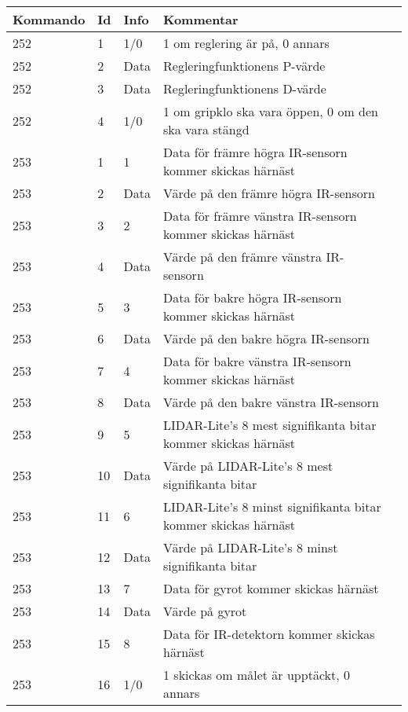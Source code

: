 \documentclass[11pt]{article}
\begin{document}
\begin{flushleft}
\begin{table}[h]
\begin{tabular}{|l|l|l|l|l|} \hline

\textbf{Kommando} & \textbf{Id} & \textbf{Info} & \textbf{Kommentar}\\ \hline

252 & 1 & 1/0 & 1 om reglering är på, 0 annars \\ \hline
252 & 2 & Data & Regleringfunktionens P-värde \\ \hline
252 & 3 & Data & Regleringfunktionens D-värde \\ \hline
252 & 4 & 1/0 & 1 om gripklo ska vara öppen, 0 om den ska vara stängd \\ \hline


253 & 1 & 1 & Data för främre högra IR-sensorn kommer skickas härnäst \\ \hline
253 & 2 & Data & Värde på den främre högra IR-sensorn \\ \hline
253 & 3 & 2 & Data för främre vänstra IR-sensorn kommer skickas härnäst \\ \hline
253 & 4 & Data & Värde på den främre vänstra IR-sensorn \\ \hline
253 & 5 & 3 & Data för bakre högra IR-sensorn kommer skickas härnäst \\ \hline
253 & 6 & Data & Värde på den bakre högra IR-sensorn \\ \hline
253 & 7 & 4 & Data för bakre vänstra IR-sensorn kommer skickas härnäst \\ \hline
253 & 8 & Data & Värde på den bakre vänstra IR-sensorn \\ \hline

253 & 9 & 5 & LIDAR-Lite's 8 mest signifikanta bitar kommer skickas härnäst \\ \hline
253 & 10 & Data & Värde på LIDAR-Lite's 8 mest signifikanta bitar \\ \hline
253 & 11 & 6 & LIDAR-Lite's 8 minst signifikanta bitar kommer skickas härnäst \\ \hline
253 & 12 & Data & Värde på LIDAR-Lite's 8 minst signifikanta bitar \\ \hline

253 & 13 & 7 & Data för gyrot kommer skickas härnäst \\ \hline
253 & 14 & Data & Värde på gyrot \\ \hline

253 & 15 & 8 & Data för IR-detektorn kommer skickas härnäst \\ \hline
253 & 16 & 1/0 & 1 skickas om målet är upptäckt, 0 annars \\ \hline


\end{tabular}
\end{table}
\end{flushleft}
\end{document}
